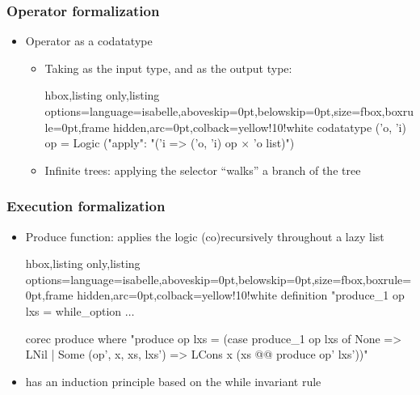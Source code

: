 \documentclass[aspectratio=169,10pt]{beamer}
\begin{document}
\begin{frame}[fragile]
  \frametitle{Operator formalization}
  \begin{itemize}
    \item Operator as a codatatype
          \begin{itemize}
            \item Taking  as the input type, and  as the output type:
\vspace*{-1.5ex}
\begin{tcblisting}{hbox,listing only,listing options={language=isabelle,aboveskip=0pt,belowskip=0pt},size=fbox,boxrule=0pt,frame hidden,arc=0pt,colback=yellow!10!white}
codatatype ('o, 'i) op = Logic ("apply": "('i => ('o, 'i) op $\times$ 'o list)")
\end{tcblisting}
\vspace*{-1.5ex}
          \pause
            \item Infinite trees: applying the selector  ``walks'' a branch of the tree
          \end{itemize}
  \end{itemize}
\end{frame}

\begin{frame}[fragile]
  \frametitle{Execution formalization}
  \begin{itemize}
    \item Produce function: applies the logic (co)recursively throughout a lazy list
\vspace*{-1.5ex}
\begin{tcblisting}{hbox,listing only,listing options={language=isabelle,aboveskip=0pt,belowskip=0pt},size=fbox,boxrule=0pt,frame hidden,arc=0pt,colback=yellow!10!white}
definition "produce_1 op lxs = while_option $\ldots$

corec produce where
  "produce op lxs = (case produce_1 op lxs of None => LNil
    | Some (op', x, xs, lxs') => LCons x (xs @@ produce op' lxs'))"
\end{tcblisting}
\vspace*{-1.5ex}
          \pause
          \item {} has an induction principle based on the while invariant rule
  \end{itemize}
\end{frame}
\end{document}

